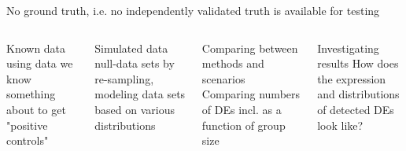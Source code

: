 \documentclass{beamer}\usepackage[]{graphicx}\usepackage[]{color}
\begin{document}
\begin{frame}
No ground truth, i.e. no independently validated truth is available for testing \pause
\vspace{0.5cm}
\begin{columns}
\scriptsize
\begin{block}{Known data}
using data we know something about to get "positive controls"
\end{block} \pause

\begin{block}{Simulated data} 
null-data sets by re-sampling, modeling data sets based on various distributions
\end{block} \pause

\scriptsize
\begin{block}{Comparing between methods and scenarios}
Comparing numbers of DEs incl. as a function of group size 
\end{block} \pause

\begin{block}{Investigating results}
How does the expression and distributions of detected DEs look like?
\end{block}

\end{columns}
\end{frame}

\end{document}
